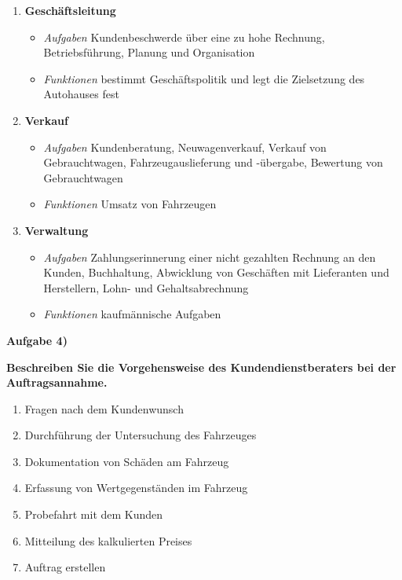 \begin{enumerate}
\item
  \textbf{Geschäftsleitung}

  \begin{itemize}
  \item
    \emph{Aufgaben} Kundenbeschwerde über eine zu hohe Rechnung,
    Betriebsführung, Planung und Organisation
  \item
    \emph{Funktionen} bestimmt Geschäftspolitik und legt die Zielsetzung
    des Autohauses fest
  \end{itemize}
\item
  \textbf{Verkauf}

  \begin{itemize}
  \item
    \emph{Aufgaben} Kundenberatung, Neuwagenverkauf, Verkauf von
    Gebrauchtwagen, Fahrzeugauslieferung und -übergabe, Bewertung von
    Gebrauchtwagen
  \item
    \emph{Funktionen} Umsatz von Fahrzeugen
  \end{itemize}
\item
  \textbf{Verwaltung}

  \begin{itemize}
  \item
    \emph{Aufgaben} Zahlungserinnerung einer nicht gezahlten Rechnung an
    den Kunden, Buchhaltung, Abwicklung von Geschäften mit Lieferanten
    und Herstellern, Lohn- und Gehaltsabrechnung
  \item
    \emph{Funktionen} kaufmännische Aufgaben
  \end{itemize}
\end{enumerate}

\textbf{Aufgabe 4)}

\textbf{Beschreiben Sie die Vorgehensweise des Kundendienstberaters bei
der Auftragsannahme.}

\begin{enumerate}
\item
  Fragen nach dem Kundenwunsch
\item
  Durchführung der Untersuchung des Fahrzeuges
\item
  Dokumentation von Schäden am Fahrzeug
\item
  Erfassung von Wertgegenständen im Fahrzeug
\item
  Probefahrt mit dem Kunden
\item
  Mitteilung des kalkulierten Preises
\item
  Auftrag erstellen
\end{enumerate}

